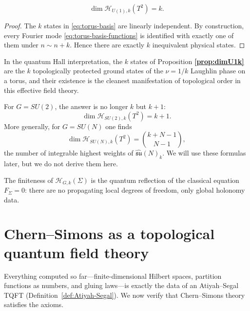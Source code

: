 \begin{proposition}\label{prop:dimU1k}
\begin{equation}
\dim \mathcal{H}_{U(1),k}(T^2) = k.
\end{equation}
\end{proposition}

\begin{proof}
The $k$ states in \eqref{eq:torus-basis} are linearly independent. By construction, every Fourier mode \eqref{eq:torus-basis-functions} is identified with exactly one of them under $n\sim n+k$. Hence there are exactly $k$ inequivalent physical states.
\end{proof}

\noindent In the quantum Hall interpretation, the $k$ states of Proposition \textbf{\ref{prop:dimU1k}} are the $k$ topologically protected ground states of the $\nu = 1/k$ Laughlin phase on a torus, and their existence is the cleanest manifestation of topological order in this effective field theory.

\begin{example}\label{ex:SU2-torus}
For $G = SU(2)$, the answer is no longer $k$ but $k+1$:
\begin{equation*}
\dim \mathcal{H}_{SU(2),k}(T^2) = k+1.
\end{equation*}
More generally, for $G = SU(N)$ one finds
\begin{equation*}
\dim \mathcal{H}_{SU(N),k}(T^2) = \binom{k+N-1}{N-1},
\end{equation*}
the number of integrable highest weights of $\widehat{\mathfrak{su}}(N)_k$. We will use these formulas later, but we do not derive them here.
\end{example}

\medskip

\noindent The finiteness of $\mathcal{H}_{G,k}(\Sigma)$ is the quantum reflection of the classical equation $F_\Sigma=0$: there are no propagating local degrees of freedom, only global holonomy data.

\section{Chern--Simons as a topological quantum field theory}\label{sec:TQFT}

Everything computed so far---finite-dimensional Hilbert spaces, partition functions as numbers, and gluing laws---is exactly the data of an Atiyah--Segal TQFT (Definition~\ref{def:Atiyah-Segal}).  We now verify that Chern--Simons theory satisfies the axioms.

